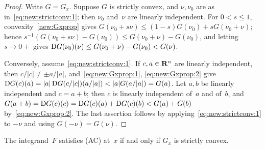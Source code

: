\documentclass[a4paper,twoside,leqno]{article}
\begin{document}
\begin{proof}
    Write $G = G_x$. Suppose $G$ is strictly convex, and $\nu, \nu_0$ are as
    in~\eqref{eq:new:strictconv:1}; then $\nu_0$ and~$\nu$ are linearly independent. For $0 < s \le
    1$, convexity~\ref{new:Gxprop} gives $G(\nu_0 + s \nu) \le (1-s) G(\nu_0) + s G(\nu_0 + \nu)$;
    hence $s^{-1}(G(\nu_0 + s\nu) - G(\nu_0)) \le G(\nu_0 + \nu) - G(\nu_0)$, and letting $s \to
    0+$ gives $\mathrm{D} G(\nu_0)(\nu) \le G(\nu_0 + \nu) - G(\nu_0) < G(\nu)$.

    Conversely, assume~\eqref{eq:new:strictconv:1}. If $c, a \in \mathbf{R}^{n}$ are linearly
    independent, then $c/|c| \ne \pm a/|a|$, and~\eqref{eq:new:Gxprop:1},
    \eqref{eq:new:Gxprop:2} give $\mathrm{D} G(c)(a) = |a| \, \mathrm{D} G(c/|c|)(a/|a|) < |a| G(a/|a|) = G(a)$.
    Let $a, b$ be linearly independent and $c = a + b$; then $c$ is linearly independent of~$a$ and
    of~$b$, and $G(a + b) = \mathrm{D} G(c)(c) = \mathrm{D} G(c)(a) + \mathrm{D} G(c)(b) < G(a) + G(b)$
    by~\eqref{eq:new:Gxprop:2}. The last assertion follows by applying~\eqref{eq:new:strictconv:1}
    to $-\nu$ and using $G(-\nu) = G(\nu)$.
\end{proof}

\begin{theorem}
    \label{ddg:1.3}
    The integrand~$F$ satisfies (AC) at~$x$ if and only if $G_x$ is strictly convex.
\end{theorem}
\end{document}

